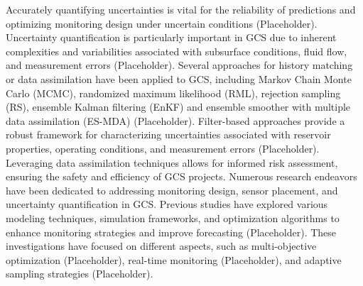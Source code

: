 \documentclass[10pt, twoside]{article}
\begin{document}
Accurately quantifying uncertainties is vital for the reliability of predictions and optimizing monitoring design under uncertain conditions (Placeholder). Uncertainty quantification is particularly important in GCS due to inherent complexities and variabilities associated with subsurface conditions, fluid flow, and measurement errors (Placeholder). Several approaches for history matching or data assimilation have been applied to GCS, including Markov Chain Monte Carlo (MCMC), randomized maximum likelihood (RML), rejection sampling (RS), ensemble Kalman filtering (EnKF) and ensemble smoother with multiple data assimilation (ES-MDA) (Placeholder). Filter-based approaches provide a robust framework for characterizing uncertainties associated with reservoir properties, operating conditions, and measurement errors (Placeholder). Leveraging data assimilation techniques allows for informed risk assessment, ensuring the safety and efficiency of GCS projects. 
Numerous research endeavors have been dedicated to addressing monitoring design, sensor placement, and uncertainty quantification in GCS. Previous studies have explored various modeling techniques, simulation frameworks, and optimization algorithms to enhance monitoring strategies and improve forecasting (Placeholder). These investigations have focused on different aspects, such as multi-objective optimization (Placeholder), real-time monitoring (Placeholder), and adaptive sampling strategies (Placeholder). 
\end{document}
